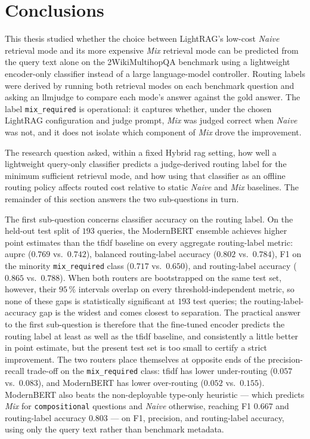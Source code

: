 \documentclass[english, bibtex]{kththesis}               %
\numberwithin{listing}{chapter}
\begin{document}
\section{Conclusions}
\label{sec:conclusions}

This thesis studied whether the choice between LightRAG's low-cost \emph{Naive} retrieval mode and its more expensive \emph{Mix} retrieval mode can be predicted from the query text alone on the 2WikiMultihopQA benchmark using a lightweight encoder-only classifier instead of a large language-model controller. Routing labels were derived by running both retrieval modes on each benchmark question and asking an \gls{llmjudge} \cite{zheng2023judge} to compare each mode's answer against the gold answer. The label \texttt{mix\_required} is operational: it captures whether, under the chosen LightRAG configuration and judge prompt, \emph{Mix} was judged correct when \emph{Naive} was not, and it does not isolate which component of \emph{Mix} drove the improvement.

The research question asked, within a fixed Hybrid \gls{rag} setting, how well a lightweight query-only classifier predicts a judge-derived routing label for the minimum sufficient retrieval mode, and how using that classifier as an offline routing policy affects routed cost relative to static \emph{Naive} and \emph{Mix} baselines. The remainder of this section answers the two sub-questions in turn.

The first sub-question concerns classifier accuracy on the routing label. On the held-out test split of $193$ queries, the ModernBERT ensemble achieves higher point estimates than the \gls{tfidf} baseline on every aggregate routing-label metric: \gls{auprc} ($0.769$ vs.\ $0.742$), balanced routing-label accuracy ($0.802$ vs.\ $0.784$), F1 on the minority \texttt{mix\_required} class ($0.717$ vs.\ $0.650$), and routing-label accuracy ($0.865$ vs.\ $0.788$). When both routers are bootstrapped on the same test set, however, their $95\,\%$ intervals overlap on every threshold-independent metric, so none of these gaps is statistically significant at $193$ test queries; the routing-label-accuracy gap is the widest and comes closest to separation. The practical answer to the first sub-question is therefore that the fine-tuned encoder predicts the routing label at least as well as the \gls{tfidf} baseline, and consistently a little better in point estimate, but the present test set is too small to certify a strict improvement. The two routers place themselves at opposite ends of the precision-recall trade-off on the \texttt{mix\_required} class: \gls{tfidf} has lower under-routing ($0.057$ vs.\ $0.083$), and ModernBERT has lower over-routing ($0.052$ vs.\ $0.155$). ModernBERT also beats the non-deployable type-only heuristic --- which predicts \emph{Mix} for \texttt{compositional} questions and \emph{Naive} otherwise, reaching F1 $0.667$ and routing-label accuracy $0.803$ --- on F1, precision, and routing-label accuracy, using only the query text rather than benchmark metadata.
\end{document}
